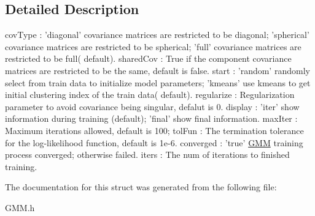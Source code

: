 \subsection{Detailed Description}
cov\+Type \+: 'diagonal' covariance matrices are restricted to be diagonal; 'spherical' covariance matrices are restricted to be spherical; 'full' covariance matrices are restricted to be full( default). shared\+Cov \+: True if the component covariance matrices are restricted to be the same, default is false. start \+: 'random' randomly select from train data to initialize model parameters; 'kmeans' use kmeans to get initial clustering index of the train data( default). regularize \+: Regularization parameter to avoid covariance being singular, defalut is 0. display \+: 'iter' show information during training (default); 'final' show final information. max\+Iter \+: Maximum iterations allowed, default is 100; tol\+Fun \+: The termination tolerance for the log-\/likelihood function, default is 1e-\/6. converged \+: 'true' \hyperlink{class_g_m_m}{G\+M\+M} training process converged; otherwise failed. iters \+: The num of iterations to finished training. 

The documentation for this struct was generated from the following file\+:\begin{DoxyCompactItemize}
\item 
G\+M\+M.\+h\end{DoxyCompactItemize}
